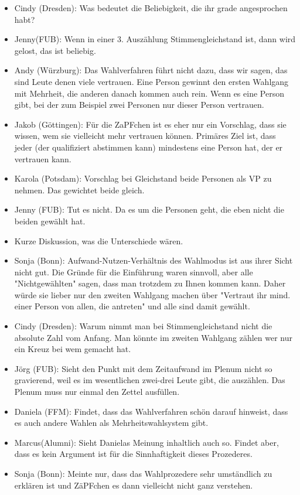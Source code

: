 \begin{itemize}
        \item Cindy (Dresden): Was bedeutet die Beliebigkeit, die ihr grade angesprochen habt?
        \item Jenny(FUB): Wenn in einer 3. Auszählung Stimmengleichstand ist, dann wird gelost, das ist beliebig.
        \item Andy (Würzburg): Das Wahlverfahren führt nicht dazu, dass wir sagen, das sind Leute denen viele vertrauen. Eine Person gewinnt den ersten Wahlgang mit Mehrheit, die anderen danach kommen auch rein. Wenn es eine Person gibt, bei der zum Beispiel zwei Personen nur dieser Person vertrauen.
        \item Jakob (Göttingen): Für die ZaPFchen ist es eher nur ein Vorschlag, dass sie wissen, wem sie vielleicht mehr vertrauen können. Primäres Ziel ist, dass jeder (der qualifiziert abstimmen kann) mindestens eine Person hat, der er vertrauen kann.
        \item Karola (Potsdam): Vorschlag bei Gleichstand beide Personen als VP zu nehmen. Das gewichtet beide gleich.
        \item Jenny (FUB): Tut es nicht. Da es um die Personen geht, die eben nicht die beiden gewählt hat.
        \item Kurze Diskussion, was die Unterschiede wären.
        \item Sonja (Bonn): Aufwand-Nutzen-Verhältnis des Wahlmodus ist aus ihrer Sicht nicht gut. Die Gründe für die Einführung waren sinnvoll, aber alle "Nichtgewählten" sagen, dass man trotzdem zu Ihnen kommen kann. Daher würde sie lieber nur den zweiten Wahlgang machen über "Vertraut ihr mind. einer Person von allen, die antreten" und alle sind damit gewählt.
        \item Cindy (Dresden): Warum nimmt man bei Stimmengleichstand nicht die absolute Zahl vom Anfang. Man könnte im zweiten Wahlgang zählen wer nur ein Kreuz bei wem gemacht hat.
        \item Jörg (FUB): Sieht den Punkt mit dem Zeitaufwand im Plenum nicht so gravierend, weil es im wesentlichen zwei-drei Leute gibt, die auszählen. Das Plenum muss nur einmal den Zettel ausfüllen.
        \item Daniela (FFM): Findet, dass das Wahlverfahren schön darauf hinweist, dass es auch andere Wahlen als Mehrheitswahlsystem gibt.
        \item Marcus(Alumni): Sieht Danielas Meinung inhaltlich auch so. Findet aber, dass es kein Argument ist für die Sinnhaftigkeit dieses Prozederes.
        \item Sonja (Bonn): Meinte nur, dass das Wahlprozedere sehr umständlich zu erklären ist und ZäPFchen es dann vielleicht nicht ganz verstehen.

\end{itemize}
